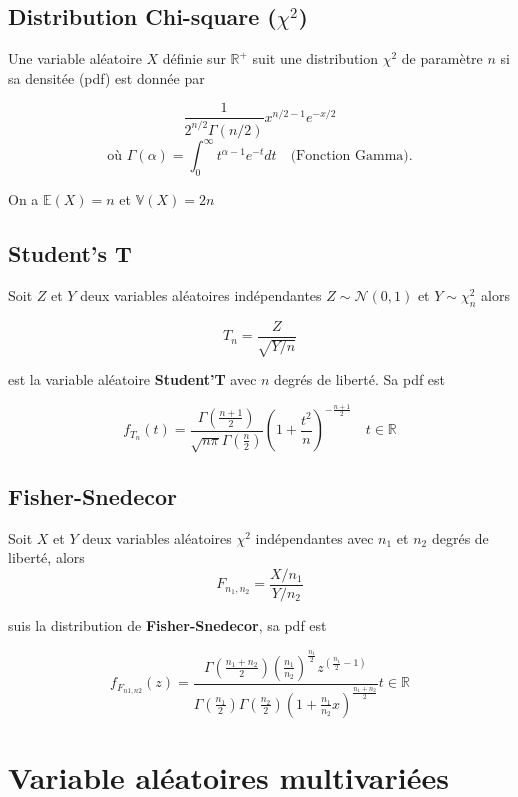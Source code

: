 \documentclass[12pt,a4paper]{article}
\begin{document}
\subsection{Distribution Chi-square ($\chi^2$)}

Une variable aléatoire $X$ définie sur $\mathbb{R}^+$ suit une distribution $\chi^2$ de paramètre $n$ si sa densitée (pdf) est donnée par

$$
\frac{1}{2^{n/2}\Gamma(n/2)} x^{n/2-1} e^{-x/2}
$$
$$
\text{où } \Gamma(\alpha) = \int_0^\infty t^{\alpha-1} e^{-t} dt \quad \text{(Fonction Gamma)}.
$$

On a $\mathbb{E}(X) = n$ et $\mathbb{V}(X) = 2n$

\subsection{Student's T}

Soit $Z$ et $Y$ deux variables aléatoires indépendantes $Z\sim \mathcal{N}(0,1)$ et $Y\sim \chi_n^2$ alors

$$T_n = \frac{Z}{\sqrt{Y/n}}$$

est la variable aléatoire \textbf{Student'T} avec $n$ degrés de liberté. Sa pdf est

$$
f_{T_n}(t) = \frac{\Gamma\left(\frac{n+1}{2}\right)}{\sqrt{n\pi}\Gamma\left(\frac{n}{2}\right)}\left(1+\frac{t^2}{n}\right)^{-\frac{n+1}{2}} \quad t \in \mathbb{R}
$$


\subsection{Fisher-Snedecor}

Soit $X$ et $Y$ deux variables aléatoires $\chi^2$ indépendantes avec $n_1$ et $n_2$ degrés de liberté, alors
$$F_{n_1,n_2} = \frac{X/n_1}{Y/n_2}$$

suis la distribution de \textbf{Fisher-Snedecor}, sa pdf est

$$f_{F_{n1,n2}}(z) = \frac{\Gamma \left(\frac{n_1 + n_2}{2}\right) \left(\frac{n_1}{n_2}\right)^{\frac{n_1}{2}} z^{\left(\frac{n_1}{2} - 1\right)}}{\Gamma \left(\frac{n_1}{2}\right) \Gamma \left(\frac{n_2}{2}\right)\left(1 + \frac{n_1}{n_2}x\right)^{\frac{n_1 + n_2}{2}}} t \in \mathbb{R}$$


\break

\section{Variable aléatoires multivariées}
\end{document}
